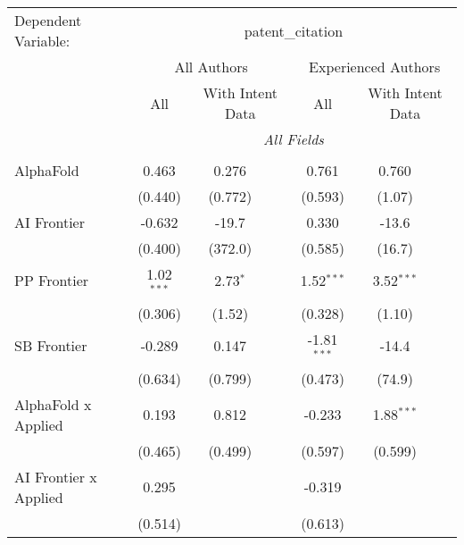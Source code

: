 \begingroup
\centering
\begin{tabular}{lcccccc}
   \tabularnewline \midrule \midrule
   Dependent Variable: & \multicolumn{6}{c}{patent\_citation}\\
 & \multicolumn{3}{c}{All Authors} & \multicolumn{3}{c}{Experienced Authors} \\
\cmidrule(lr){2-4} \cmidrule(lr){5-7}
 & \multicolumn{1}{c}{All} & \multicolumn{2}{c}{With Intent Data} & \multicolumn{1}{c}{All} & \multicolumn{2}{c}{With Intent Data} \\
\cmidrule(lr){2-2} \cmidrule(lr){3-4} \cmidrule(lr){5-5} \cmidrule(lr){6-7}
 & \multicolumn{6}{c}{\textit{All Fields}} \\ \\
   AlphaFold                      & 0.463          & 0.276      &               & 0.761          & 0.760        &   \\   
                                  & (0.440)        & (0.772)    &               & (0.593)        & (1.07)       &   \\   
   AI Frontier                    & -0.632         & -19.7      &               & 0.330          & -13.6        &   \\   
                                  & (0.400)        & (372.0)    &               & (0.585)        & (16.7)       &   \\   
   PP Frontier                    & 1.02$^{***}$   & 2.73$^{*}$ &               & 1.52$^{***}$   & 3.52$^{***}$ &   \\   
                                  & (0.306)        & (1.52)     &               & (0.328)        & (1.10)       &   \\   
   SB Frontier                    & -0.289         & 0.147      &               & -1.81$^{***}$  & -14.4        &   \\   
                                  & (0.634)        & (0.799)    &               & (0.473)        & (74.9)       &   \\   
   AlphaFold x Applied            & 0.193          & 0.812      &               & -0.233         & 1.88$^{***}$ &   \\   
                                  & (0.465)        & (0.499)    &               & (0.597)        & (0.599)      &   \\   
   AI Frontier x Applied          & 0.295          &            &               & -0.319         &              &   \\   
                                  & (0.514)        &            &               & (0.613)        &              &   \\   

\end{tabular}
